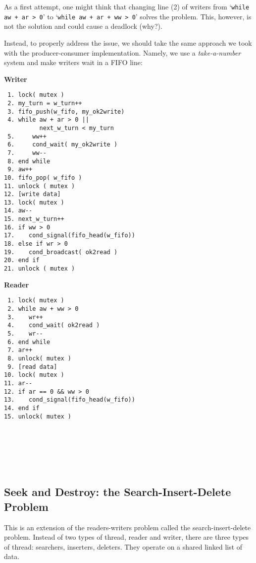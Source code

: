 As a first attempt, one might think that changing line (2) of writers from `\texttt{while aw + ar > 0}' to `\texttt{while aw + ar + ww > 0}' solves the problem.
This, however, is not the solution and could cause a deadlock (why?).

Instead, to properly address the issue, we should take the same approach we took with the producer-consumer implementation.
Namely, we use a \emph{take-a-number} system and make writers wait in a FIFO line:

\newpage

\begin{multicols}{2}
    \textbf{Writer}\vspace{-2em}
    \begin{verbatim}
 1. lock( mutex )
 2. my_turn = w_turn++
 3. fifo_push(w_fifo, my_ok2write)
 4. while aw + ar > 0 ||
          next_w_turn < my_turn
 5.     ww++
 6.     cond_wait( my_ok2write )
 7.     ww--
 8. end while
 9. aw++
10. fifo_pop( w_fifo )
11. unlock ( mutex )
12. [write data]
13. lock( mutex )
14. aw--
15. next_w_turn++
16. if ww > 0
17.    cond_signal(fifo_head(w_fifo))
18. else if wr > 0
19.    cond_broadcast( ok2read )
20. end if
21. unlock ( mutex )
    \end{verbatim}
    \columnbreak
    \textbf{Reader}\vspace{-2em}
    \begin{verbatim}
 1. lock( mutex )
 2. while aw + ww > 0
 3.    wr++
 4.    cond_wait( ok2read )
 5.    wr--
 6. end while
 7. ar++
 8. unlock( mutex )
 9. [read data]
10. lock( mutex )
11. ar--
12. if ar == 0 && ww > 0
13.    cond_signal(fifo_head(w_fifo))
14. end if
15. unlock( mutex )







    \end{verbatim}
\end{multicols}
\vspace{-2em}

\subsection*{Seek and Destroy: the Search-Insert-Delete Problem}

This is an extension of the readers-writers problem called the search-insert-delete problem. Instead of two types of thread, reader and writer, there are three types of thread: searchers, inserters, deleters. They operate on a shared linked list of data.

